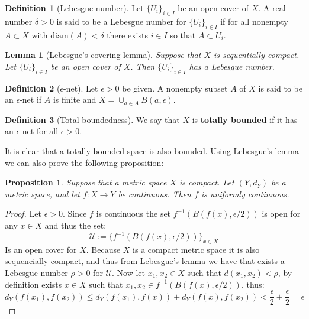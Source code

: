 \documentclass[11pt,a4paper]{article}
\theoremstyle{definition}
\newtheorem{definition}{Definition}[section]
\theoremstyle{plain}
\newtheorem{proposition}[theorem]{Proposition}
\newtheorem{lemma}[theorem]{Lemma}
\begin{document}
  \begin{definition}[Lebesgue number]
    Let $\{U_i\}_{i \in I}$ be an open cover of $X$. A real number 
    $\delta > 0$ is said to be a Lebesgue number
    for $\{U_i\}_{i \in I}$
    if for all nonempty $A \subset X$ with $\text{diam}(A) < \delta$
    there exists $i \in I$ so that $A \subset U_i$.
  \end{definition}

  \begin{lemma}[Lebesgue’s covering lemma]
    Suppose that $X$ is sequentially compact. 
    Let $\{U_i\}_{i \in I}$ be an open cover of $X$. 
    Then $\{U_i\}_{i \in I}$ has a Lebesgue number.
  \end{lemma}

  \begin{definition}[$\epsilon$-net]
    Let $\epsilon > 0$ be given. A nonempty subset $A$ of $X$ is 
    said to be an $\epsilon$-net if $A$ is finite and 
    $X = \cup_{a \in A}{B(a, \epsilon)}$.
  \end{definition}

  \begin{definition}[Total boundedness]
    We say that $X$ is \textbf{totally bounded} if it has an 
    $\epsilon$-net for all $\epsilon > 0$.
  \end{definition}

  It is clear that a totally bounded space is also bounded. 
  Using Lebesgue's lemma we can also prove the following proposition:
  
  \begin{proposition}
    Suppose that a metric space $X$ is compact. Let $(Y, d_Y)$ be a 
    metric space, and let $f \colon X \to Y$ be continuous. Then $f$ is 
    uniformly continuous.	
  \end{proposition}
  \begin{proof}
    Let $\epsilon > 0$. Since $f$ is continuous the set 
    $f^{-1}(B(f(x),\epsilon/2))$ is open for any $x \in X$ and thus
    the set:
    \[
      \mathcal{U} := \{f^{-1}(B(f(x),\epsilon/2))\}_{x \in X}
    \]
    Is an open cover for $X$. Because $X$ is a compact metric space
    it is also sequencially compact, and thus from Lebesgue's lemma
    we have that exists a Lebesgue number $\rho > 0$ for $\mathcal{U}$.
    Now let $x_1,x_2 \in X$ such that $d(x_1,x_2) < \rho$, by definition
    exists $x \in X$ such that $x_1,x_2 \in f^{-1}(B(f(x),\epsilon/2))$,
    thus:
    \[
      d_Y(f(x_1),f(x_2)) \le d_Y(f(x_1),f(x)) + d_Y(f(x),f(x_2)) <
      \frac{\epsilon}{2} + \frac{\epsilon}{2} = \epsilon
    \]
  \end{proof}
\end{document}
